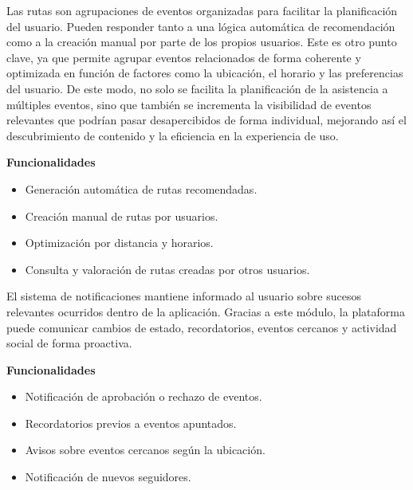 \begin{tcolorbox}[title=\textbf{Rutas}]
Las rutas son agrupaciones de eventos organizadas para facilitar la planificación del usuario. Pueden responder tanto a una lógica automática de recomendación como a la creación manual por parte de los propios usuarios. Este es otro punto clave, ya que permite agrupar eventos relacionados de forma coherente y optimizada en función de factores como la ubicación, el horario y las preferencias del usuario. De este modo, no solo se facilita la planificación de la asistencia a múltiples eventos, sino que también se incrementa la visibilidad de eventos relevantes que podrían pasar desapercibidos de forma individual, mejorando así el descubrimiento de contenido y la eficiencia en la experiencia de uso.

\vspace{0.4em}
\textbf{Funcionalidades}
\begin{itemize}[leftmargin=1.5em]
\item Generación automática de rutas recomendadas.
\item Creación manual de rutas por usuarios.
\item Optimización por distancia y horarios.
\item Consulta y valoración de rutas creadas por otros usuarios.
\end{itemize}
\end{tcolorbox}

\begin{tcolorbox}[title=\textbf{Notificaciones}]
El sistema de notificaciones mantiene informado al usuario sobre sucesos relevantes ocurridos dentro de la aplicación. Gracias a este módulo, la plataforma puede comunicar cambios de estado, recordatorios, eventos cercanos y actividad social de forma proactiva.

\vspace{0.4em}
\textbf{Funcionalidades}
\begin{itemize}[leftmargin=1.5em]
\item Notificación de aprobación o rechazo de eventos.
\item Recordatorios previos a eventos apuntados.
\item Avisos sobre eventos cercanos según la ubicación.
\item Notificación de nuevos seguidores.
\end{itemize}
\end{tcolorbox}

